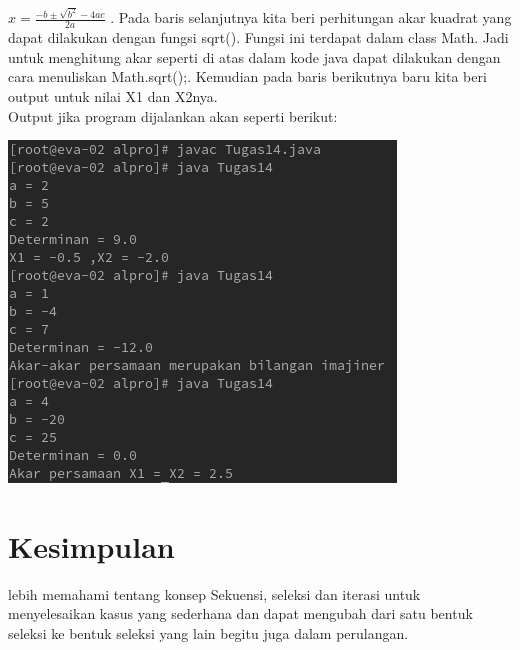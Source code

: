\documentclass[a4paper,12pt]{article}
\begin{document}
$x = \frac {−b \pm \sqrt{b^{2}} − 4ac}{2a}$
. Pada baris selanjutnya
kita beri perhitungan akar kuadrat yang dapat dilakukan dengan fungsi sqrt().
Fungsi ini terdapat dalam class Math. Jadi untuk menghitung akar seperti di
atas dalam kode java dapat dilakukan dengan cara menuliskan Math.sqrt();.
Kemudian pada baris berikutnya baru kita beri output untuk nilai X1 dan X2nya.\\
Output jika program dijalankan akan seperti berikut:
\begin{center}
    \includegraphics[scale = 0.8]{tugasb.png}
\end{center}

\newpage
\section{Kesimpulan}
lebih memahami tentang konsep
Sekuensi, seleksi dan iterasi untuk menyelesaikan kasus yang sederhana dan
dapat mengubah dari satu bentuk seleksi ke bentuk seleksi yang lain begitu juga
dalam perulangan.
\end{document}
